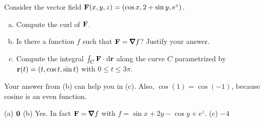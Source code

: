 \begin{question}[M317 2016A] %
Consider the vector field $\mathbf{F}(x,y,z) = (\cos x, 2 + \sin y, e^z)$.
\begin{enumerate}[(a)]
\item
   Compute the curl of $\mathbf{F}$.
\item
    Is there a function $f$ such that $\vF = \vnabla f$? 
     Justify your answer.
\item
    Compute the integral $\int_C \mathbf{F}\cdot\mathrm{d}\mathbf{r}$ along the 
curve $C$ parametrized by 
     $\mathbf{r}(t) = (t, \cos t, \sin t)$ with $0 \le t \le 3\pi$.
\end{enumerate}
\end{question}

\begin{hint} 
Your answer from (b) can help you in (c). Also, $\cos(1)=\cos(-1)$, because cosine is an even function.
\end{hint}

\begin{answer} 
(a) $\mathbf{0}$\qquad
(b) Yes. In fact $\vF=\vnabla f$ with $f=\sin x +2y-\cos y +e^z $.\qquad
(c) $-4$
\end{answer}

